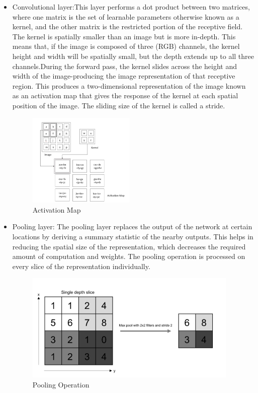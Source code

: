 \begin{itemize}
\item Convolutional layer:This layer performs a dot product between two matrices, where one matrix is the set of learnable parameters otherwise known as a kernel, and the other matrix is the restricted portion of the receptive field. The kernel is spatially smaller than an image but is more in-depth. This means that, if the image is composed of three (RGB) channels, the kernel height and width will be spatially small, but the depth extends up to all three channels.During the forward pass, the kernel slides across the height and width of the image-producing the image representation of that receptive region. This produces a two-dimensional representation of the image known as an activation map that gives the response of the kernel at each spatial position of the image. The sliding size of the kernel is called a stride.

\begin{figure}[htb] %
\begin{center}
	\includegraphics[width = 2in]{images/activationmap.png}
	\caption{Activation Map} %
	\label{figActivationMap} %
\end{center}
\end{figure}

\item Pooling layer: The pooling layer replaces the output of the network at certain locations by deriving a summary statistic of the nearby outputs. This helps in reducing the spatial size of the representation, which decreases the required amount of computation and weights. The pooling operation is processed on every slice of the representation individually.

\begin{figure}[htb] %
\begin{center}
	\includegraphics[width = 4in]{images/pooling.png}
	\caption{Pooling Operation} %
	\label{figPoolingOperation} %
\end{center}
\end{figure}


\end{itemize}
